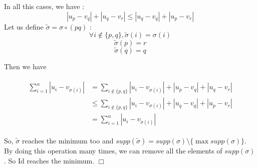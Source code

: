\documentclass{article}
\begin{document}
In all this cases, we have :
\begin{equation*}
	|u_p-v_q| + |u_q-v_r| \leq |u_q-v_q|+|u_p-v_r|
\end{equation*}
Let us define $\tilde{\sigma} = \sigma \circ (p q)$ :\newline
\begin{equation*}
 	\forall i \notin \{p,q\}, \tilde{\sigma} (i)=\sigma (i)
\end{equation*}
\begin{equation*}
 	\tilde{\sigma} (p)=r
\end{equation*}
\begin{equation*}
 	\tilde{\sigma} (q)=q
\end{equation*}

Then  we have

\begin{multline*}
	\begin{split}
	\sum_{i=1}^n |u_i-v_{\sigma (i)}|	&= \sum_{i\notin \{p,q\}} |u_i-v_{\sigma (i)}|+|u_p-v_q|+|u_q-v_r|\\
	 	&\leq \sum_{i\notin \{p,q\}} |u_i-v_{\sigma (i)}|+|u_q-v_q|+|u_p-v_r|\\
	 	&=\sum_{i=1}^n |u_i-v_{\tilde{\sigma} (i)}|
	\end{split}
	\end{multline*}

So, $\tilde{\sigma}$ reaches the minimum too and $supp(\tilde{\sigma}) = supp(\sigma) \setminus \{\max supp(\sigma) \}$. By doing this operation many times, we can remove all the elements of $supp(\sigma)$. So Id reaches the minimum. $\Box$
	
	
\end{document}
